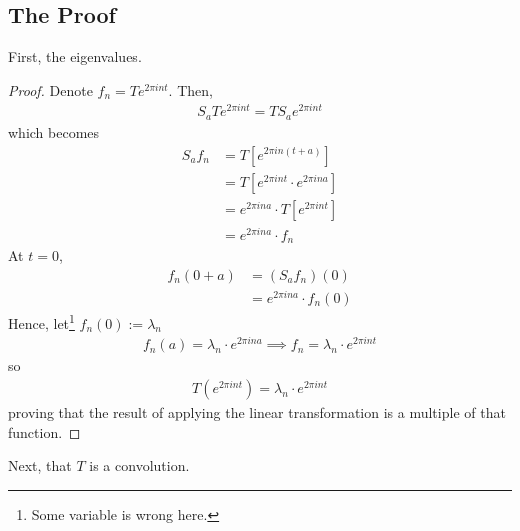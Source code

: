 \subsection{The Proof}
First, the eigenvalues.
\begin{proof}
    Denote $f_n = T e^{2\pi in t}$. Then,
    \begin{align}
        S_a T e^{2\pi in t} = T S_a e^{2\pi in t}
    \end{align}
    which becomes
    \begin{align}
        S_a f_n &= T\left[ e^{2\pi in (t+a)} \right]\\
        &= T\left[ e^{2\pi in t} \cdot e^{2\pi in a} \right]\\
        &= e^{2\pi in a} \cdot T\left[ e^{2\pi in t} \right]\\
        &= e^{2\pi in a} \cdot f_n
    \end{align}
    At $t=0$,
    \begin{align}
        f_n(0 + a) &= (S_a f_n)(0)\\
        &= e^{2\pi in a} \cdot f_n(0)
    \end{align}
    Hence, let\footnote{Some variable is wrong here.} $f_n(0) := \lambda_n$
    \begin{align}
        f_n(a) = \lambda_n \cdot e^{2\pi in a} \implies f_n = \lambda_n \cdot e^{2\pi in t}
    \end{align}
    so
    \begin{align}
        T(e^{2\pi in t}) = \lambda_n \cdot e^{2\pi in t}
    \end{align}
    proving that the result of applying the linear transformation is a multiple of that function.
\end{proof}
\noindent Next, that $T$ is a convolution.
